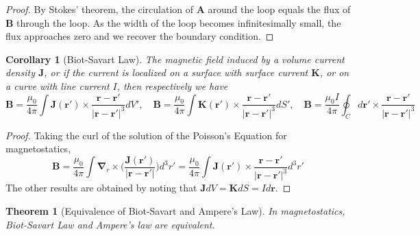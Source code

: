 \documentclass[a4paper]{article}
\theoremstyle{new}
\newtheorem{thm}{Theorem}[section]
\newtheorem{cor}{Corollary}[section]
\begin{document}
\begin{proof}
By Stokes' theorem, the circulation of $\mathbf{A}$ around the loop equals the flux of $\mathbf{B}$ through the loop. As the width of the loop becomes infinitesimally small, the flux approaches zero and we recover the boundary condition.
\end{proof}
\begin{cor}[Biot-Savart Law]
The magnetic field induced by a volume current density $\mathbf{J}$, or if the current is localized on a surface with surface current $\mathbf{K}$, or on a curve with line current $I$, then respectively we have
$$\mathbf{B}=\frac{\mu_0}{4\pi}\int\mathbf{J}(\mathbf{r'})\times\frac{\mathbf{r}-\mathbf{r'}}{|\mathbf{r}-\mathbf{r'}|^3}dV',\quad\mathbf{B}=\frac{\mu_0}{4\pi}\int\mathbf{K}(\mathbf{r'})\times\frac{\mathbf{r}-\mathbf{r'}}{|\mathbf{r}-\mathbf{r'}|^3}dS',\quad\mathbf{B}=\frac{\mu_0I}{4\pi}\oint_Cd\mathbf{r'}\times\frac{\mathbf{r}-\mathbf{r'}}{|\mathbf{r}-\mathbf{r'}|^3}$$
\end{cor}
\begin{proof}
Taking the curl of the solution of the Poisson's Equation for magnetostatics,
$$\mathbf{B}=\frac{\mu_0}{4\pi}\int\boldsymbol{\nabla}_r\times\bigg(\frac{\mathbf{J}(\mathbf{r'})}{|\mathbf{r}-\mathbf{r'}|}\bigg)d^3r'=\frac{\mu_0}{4\pi}\int\mathbf{J}(\mathbf{r'})\times\frac{\mathbf{r}-\mathbf{r'}}{|\mathbf{r}-\mathbf{r'}|^3}d^3r'$$
The other results are obtained by noting that $\mathbf{J}dV=\mathbf{K}dS=Id\mathbf{r}$.
\end{proof}
\begin{thm}[Equivalence of Biot-Savart and Ampere's Law]
In magnetostatics, Biot-Savart Law and Ampere's law are equivalent.
\end{thm}
\end{document}
